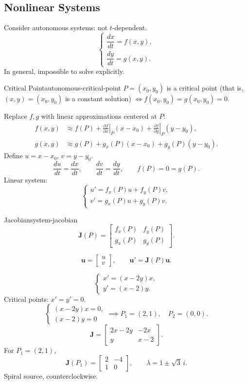 \subsection{Nonlinear Systems}
Consider autonomous systems: not $t$-dependent.
\[
  \begin{cases}
    \dfrac{dx}{dt}=f(x,y), \\[4pt]
    \dfrac{dy}{dt}=g(x,y).
  \end{cases}
\]
In general, impossible to solve explicitly.

\begin{definition}{Critical Point}{autonomous-critical-point}
  $P=(x_0,y_0)$ is a critical point (that is, $(x,y)=(x_0,y_0)$ is a constant solution)
  $\iff f(x_0,y_0)=g(x_0,y_0)=0$.
\end{definition}

Replace $f,g$ with linear approximations centered at $P$:
\begin{align*}
  f(x,y) & \approx f(P)+\left.\frac{\partial f}{\partial x}\right|_P(x-x_0)
  +\left.\frac{\partial f}{\partial y}\right|_P(y-y_0),                     \\
  g(x,y) & \approx g(P)+g_x(P)(x-x_0)+g_y(P)(y-y_0).
\end{align*}
Define $u=x-x_0$, $v=y-y_0$.
\[
  \frac{du}{dt}=\frac{dx}{dt},\qquad \frac{dv}{dt}=\frac{dy}{dt},\qquad f(P)=0=g(P).
\]
Linear system:
\[
  \begin{cases}
    u'=f_x(P)u+f_y(P)v, \\v'=g_x(P)u+g_y(P)v.
  \end{cases}
\]
\begin{definition}{Jacobian}{system-jacobian}
  \[
    \mathbf{J}(P)=
    \begin{bmatrix}
      f_x(P) & f_y(P) \\g_x(P)&g_y(P)
    \end{bmatrix}
    .
  \]
\end{definition}
\[
  \mathbf{u}=
  \begin{bmatrix}
    u \\v
  \end{bmatrix}
  ,\qquad
  \mathbf{u}'=\mathbf{J}(P)\mathbf{u}.
\]

\begin{example}
  \[
    \begin{cases}
      x'=(x-2y)x, \\y'=(x-2)y.
    \end{cases}
  \]
  Critical points: $x'=y'=0$.
  \[
    \begin{cases}
      (x-2y)x=0, \\(x-2)y=0
    \end{cases}
    \implies P_1=(2,1),\quad P_2=(0,0).
  \]
  \[
    \mathbf{J}=
    \begin{bmatrix}
      2x-2y & -2x \\y&x-2
    \end{bmatrix}
    .
  \]
  For $P_1=(2,1)$,
  \[
    \mathbf{J}(P_1)=
    \begin{bmatrix}
      2 & -4 \\1&0
    \end{bmatrix}
    ,\qquad
    \lambda=1\pm\sqrt3\,i.
  \]
  Spiral source, counterclockwise.
\end{example}

